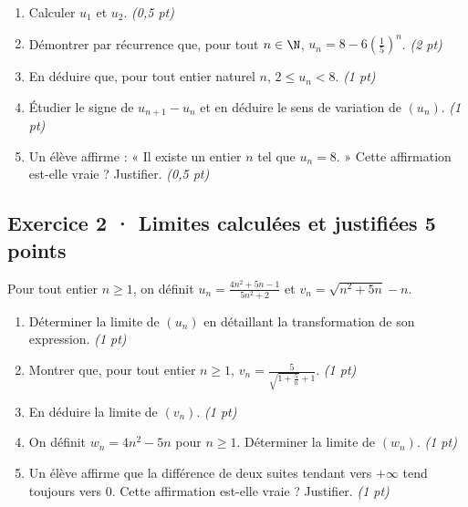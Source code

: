 \begin{enumerate}

\item Calculer $u_1$ et $u_2$. \hfill\textit{(0{,}5 pt)}

\item Démontrer par récurrence que, pour tout $n\in\N$, $u_n=8-6\left(\frac{1}{5}\right)^n$. \hfill\textit{(2 pt)}

\item En déduire que, pour tout entier naturel $n$, $2\le u_n<8$. \hfill\textit{(1 pt)}

\item Étudier le signe de $u_{n+1}-u_n$ et en déduire le sens de variation de $(u_n)$. \hfill\textit{(1 pt)}

\item Un élève affirme : « Il existe un entier $n$ tel que $u_n=8$. » Cette affirmation est-elle vraie ? Justifier. \hfill\textit{(0{,}5 pt)}

\end{enumerate}

\subsection*{Exercice 2 · Limites calculées et justifiées \hfill 5 points}Pour tout entier $n\ge1$, on définit $u_n=\frac{4n^2+5n-1}{5n^2+2}$ et $v_n=\sqrt{n^2+5n}-n$.

\begin{enumerate}

\item Déterminer la limite de $(u_n)$ en détaillant la transformation de son expression. \hfill\textit{(1 pt)}

\item Montrer que, pour tout entier $n\ge1$, $v_n=\frac{5}{\sqrt{1+\frac{5}n}+1}$. \hfill\textit{(1 pt)}

\item En déduire la limite de $(v_n)$. \hfill\textit{(1 pt)}

\item On définit $w_n=4n^2-5n$ pour $n\ge1$. Déterminer la limite de $(w_n)$. \hfill\textit{(1 pt)}

\item Un élève affirme que la différence de deux suites tendant vers $+\infty$ tend toujours vers $0$. Cette affirmation est-elle vraie ? Justifier. \hfill\textit{(1 pt)}

\end{enumerate}

